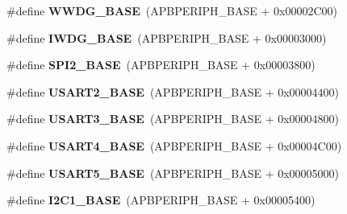 \begin{DoxyCompactItemize}
\mbox{\label{group___peripheral__memory__map_ga9a5bf4728ab93dea5b569f5b972cbe62}} 
\#define {\bfseries W\+W\+D\+G\+\_\+\+B\+A\+SE}~(A\+P\+B\+P\+E\+R\+I\+P\+H\+\_\+\+B\+A\+SE + 0x00002\+C00)
\item 
\mbox{\label{group___peripheral__memory__map_ga8543ee4997296af5536b007cd4748f55}} 
\#define {\bfseries I\+W\+D\+G\+\_\+\+B\+A\+SE}~(A\+P\+B\+P\+E\+R\+I\+P\+H\+\_\+\+B\+A\+SE + 0x00003000)
\item 
\mbox{\label{group___peripheral__memory__map_gac3e357b4c25106ed375fb1affab6bb86}} 
\#define {\bfseries S\+P\+I2\+\_\+\+B\+A\+SE}~(A\+P\+B\+P\+E\+R\+I\+P\+H\+\_\+\+B\+A\+SE + 0x00003800)
\item 
\mbox{\label{group___peripheral__memory__map_gade83162a04bca0b15b39018a8e8ec090}} 
\#define {\bfseries U\+S\+A\+R\+T2\+\_\+\+B\+A\+SE}~(A\+P\+B\+P\+E\+R\+I\+P\+H\+\_\+\+B\+A\+SE + 0x00004400)
\item 
\mbox{\label{group___peripheral__memory__map_gabe0d6539ac0026d598274ee7f45b0251}} 
\#define {\bfseries U\+S\+A\+R\+T3\+\_\+\+B\+A\+SE}~(A\+P\+B\+P\+E\+R\+I\+P\+H\+\_\+\+B\+A\+SE + 0x00004800)
\item 
\mbox{\label{group___peripheral__memory__map_gafa384bb1e7d610a806f7c1f1dbc72ac5}} 
\#define {\bfseries U\+S\+A\+R\+T4\+\_\+\+B\+A\+SE}~(A\+P\+B\+P\+E\+R\+I\+P\+H\+\_\+\+B\+A\+SE + 0x00004\+C00)
\item 
\mbox{\label{group___peripheral__memory__map_gab34de0b56d40b6895b53bb60ced2574f}} 
\#define {\bfseries U\+S\+A\+R\+T5\+\_\+\+B\+A\+SE}~(A\+P\+B\+P\+E\+R\+I\+P\+H\+\_\+\+B\+A\+SE + 0x00005000)
\item 
\mbox{\label{group___peripheral__memory__map_gacd72dbffb1738ca87c838545c4eb85a3}} 
\#define {\bfseries I2\+C1\+\_\+\+B\+A\+SE}~(A\+P\+B\+P\+E\+R\+I\+P\+H\+\_\+\+B\+A\+SE + 0x00005400)
\item 
\mbox{\label{group___peripheral__memory__map_ga04bda70f25c795fb79f163b633ad4a5d}} 

\end{DoxyCompactItemize}

